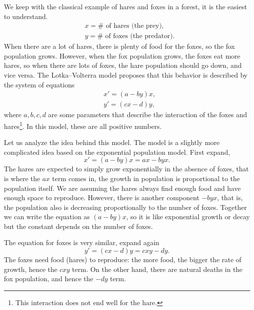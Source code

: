 We keep
with the classical example of hares and foxes in a forest, it is the
easiest to understand.
\begin{equation*}
\begin{aligned}
& x = \# \text{ of hares (the prey),} \\
& y = \# \text{ of foxes (the predator).}
\end{aligned}
\end{equation*}
When there are a lot of hares, there is plenty of food for the foxes, so
the fox population grows.  However, when the fox population grows, the foxes
eat more hares, so when there are lots of foxes, the hare population
should go down, and vice versa.
The Lotka--Volterra model proposes that this 
behavior is described by the system of equations
\begin{equation*}
\begin{aligned}
& x' = (a-by)x, \\
& y' = (cx-d)y,
\end{aligned}
\end{equation*}
where $a,b,c,d$ are some parameters that describe the interaction of the
foxes and hares\footnote{This interaction does not end well for the
hare.}.  In this model, these are all positive numbers.

Let us analyze the idea behind this model.  The model is a slightly more
complicated idea based on the exponential population model.
First expand,
\begin{equation*}
x' = (a-by)x = ax - byx .
\end{equation*}
The hares are expected to simply grow exponentially in the absence of foxes,
that is where the $ax$ term comes in, the growth in population is
proportional to the population itself.  We are assuming the hares
always find enough food and have enough space to reproduce.  However,
there is another component $-byx$, that is, the population also is
decreasing proportionally to the number of foxes.  Together we can write the
equation as $(a-by)x$, so it is like exponential growth or decay but the
constant depends on the number of foxes.

The equation for foxes is very similar, expand again
\begin{equation*}
y' = (cx-d)y = cxy-dy .
\end{equation*}
The foxes need food (hares) to reproduce: the more food, the bigger the
rate of growth, hence the $cxy$ term.  On the other hand, there are 
natural deaths in the fox population, and hence the $-dy$ term.

